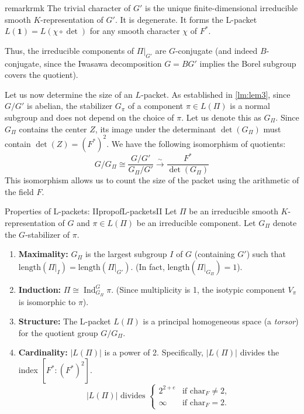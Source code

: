 \documentclass{article}
\begin{document}
\begin{titledBox}{remark}{rmk}
  The trivial character of \(G'\) is the unique finite-dimensional irreducible smooth \(K\)-representation of \(G'\). It is degenerate. It forms the L-packet \(L(\mathbf{1}) = L(\chi \circ \det)\) for any smooth character \(\chi\) of \(F^*\).
\end{titledBox}

Thus, the irreducible components of \(\Pi|_{G'}\) are \(G\)-conjugate (and indeed \(B\)-conjugate, since the Iwasawa decomposition \(G = BG'\) implies the Borel subgroup covers the quotient).

Let us now determine the size of an \(L\)-packet. As established in \cref{lm:lem3}, since \(G/G'\) is abelian,
the stabilizer \(G_{\pi}\) of a component \(\pi \in L(\Pi)\) is a normal subgroup and does not depend on the
choice of \(\pi\). Let us denote this as \(G_{\Pi}\). Since \(G_{\Pi}\) contains the center \(Z\), its image
under the determinant \(\det(G_{\Pi})\) must contain \(\det(Z) = (F^*)^2\). We have the following isomorphism
of quotients:
\[
  G/G_\Pi \cong \frac{G/G'}{G_\Pi/G'} \xrightarrow{\sim} \frac{F^*}{\det(G_\Pi)}
\]
This isomorphism allows us to count the size of the packet using the arithmetic of the field \(F\).

\begin{prop}{Properties of L-packets: II}{propofL-packetsII}
  Let \(\Pi\) be an irreducible smooth \(K\)-representation of \(G\) and \(\pi \in L(\Pi)\) be an irreducible component. Let \(G_\Pi\) denote the \(G\)-stabilizer of \(\pi\).
  \begin{enumerate}
    \item \textbf{Maximality:} \(G_\Pi\) is the largest subgroup \(I\) of \(G\) (containing \(G'\)) such that \(\mathrm{length}(\Pi|_I) = \mathrm{length}(\Pi|_{G'})\). (In fact, \(\mathrm{length}(\Pi|_{G_\Pi}) = 1\)).
    \item \textbf{Induction:} \(\Pi \cong \operatorname{Ind}_{G_\Pi}^G \pi\). (Since multiplicity is 1, the isotypic component \(V_\pi\) is isomorphic to \(\pi\)).
    \item \textbf{Structure:} The L-packet \(L(\Pi)\) is a principal homogeneous space (a \emph{torsor}) for the quotient group \(G/G_\Pi\).
    \item \textbf{Cardinality:} \(|L(\Pi)|\) is a power of 2. Specifically, \(|L(\Pi)|\) divides the index \([F^* : (F^*)^2]\).
    \[
      |L(\Pi)| \text{ divides } \begin{cases}
        2^{2+e} & \text{if } \mathrm{char}_F \neq 2, \\
        \infty & \text{if } \text{char}_F = 2.
      \end{cases}
    \]
  \end{enumerate}
\end{prop}
\end{document}
